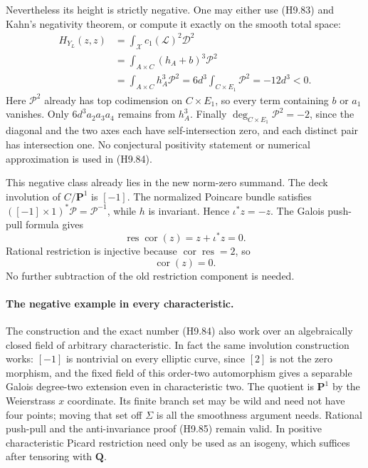 \documentclass[11pt,a4paper]{article}
\begin{document}
Nevertheless its height is strictly negative. One may either use
(H9.83) and Kahn's negativity theorem, or compute it exactly on the
smooth total space:
\[
 \begin{aligned}
 H_{Y_L}(z,z)
  &=\int_{\mathcal X}c_1(\mathcal L)^2\mathcal D^2\\
  &=\int_{A\times C}(h_A+b)^3\mathcal P^2\\
  &=\int_{A\times C}h_A^3\mathcal P^2
    =6d^3\int_{C\times E_1}\mathcal P^2
    =-12d^3<0.
 \end{aligned}                                               \tag{H9.84}
\]
Here $\mathcal P^2$ already has top codimension on $C\times E_1$,
so every term containing $b$ or $a_1$ vanishes. Only
$6d^3a_2a_3a_4$ remains from $h_A^3$. Finally
$\deg_{C\times E_1}\mathcal P^2=-2$, since the diagonal and the
two axes each have self-intersection zero, and each distinct pair
has intersection one. No conjectural positivity statement or
numerical approximation is used in (H9.84).

This negative class already lies in the new norm-zero summand.
The deck involution of $C/\mathbf P^1$ is $[-1]$.
The normalized Poincare bundle satisfies
$([-1]\times1)^*\mathcal P=\mathcal P^{-1}$, while $h$ is
invariant. Hence $\iota^*z=-z$. The Galois push-pull formula gives
\[
 \operatorname{res}\operatorname{cor}(z)=z+\iota^*z=0.
\]
Rational restriction is injective because
$\operatorname{cor}\operatorname{res}=2$, so
\[
                         \operatorname{cor}(z)=0.            \tag{H9.85}
\]
No further subtraction of the old restriction component is needed.

\paragraph{The negative example in every characteristic.}
The construction and the exact number (H9.84) also work over an
algebraically closed field of arbitrary characteristic. In fact the
same involution construction works: $[-1]$ is nontrivial on every
elliptic curve, since $[2]$ is not the zero morphism, and the fixed
field of this order-two automorphism gives a separable Galois
degree-two extension even in characteristic two. The quotient is
$\mathbf P^1$ by the Weierstrass $x$ coordinate. Its finite branch
set may be wild and need not have four points; moving that set
off $\Sigma$ is all the smoothness argument needs. Rational
push-pull and the anti-invariance proof (H9.85) remain valid.
In positive characteristic Picard restriction need only be used as
an isogeny, which suffices after tensoring with $\mathbf Q$.
\end{document}
